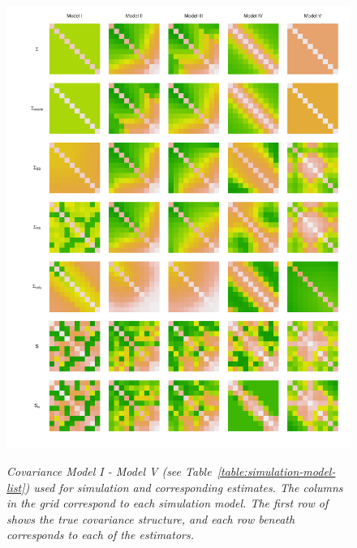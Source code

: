 \begin{figure}[H] 
\centering
  \includegraphics[width = 1\textwidth]{img/chapter-4/cov-estimate-lattice}\label{fig:cov-estimate-lattice}
  \vspace*{-10mm}
  \caption{\textit{Covariance Model I - Model V (see Table~\ref{table:simulation-model-list}) used for simulation and corresponding estimates. The columns in the grid correspond to each simulation model. The first row of shows the true covariance structure, and each row beneath corresponds to each of the estimators.}}
\end{figure}

